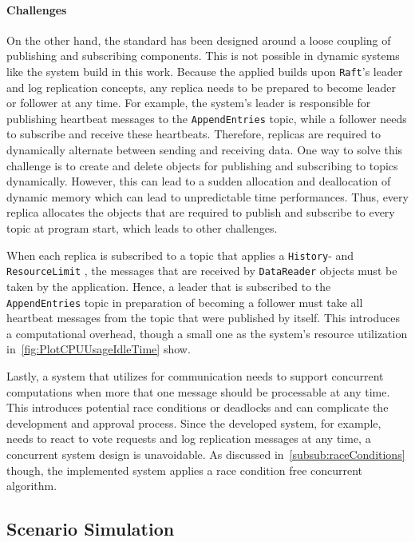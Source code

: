\paragraph{Challenges}
On the other hand, the  standard has been designed around a loose coupling of publishing and subscribing components.
This is not possible in dynamic systems like the system build in this work.
Because the applied  builds upon \texttt{Raft}'s leader and log replication concepts, any replica needs to be prepared to become leader or follower at any time.
For example, the system's leader is responsible for publishing heartbeat messages to the \texttt{AppendEntries} topic, while a follower needs to subscribe and receive these heartbeats.
Therefore, replicas are required to dynamically alternate between sending and receiving data.
One way to solve this challenge is to create and delete objects for publishing and subscribing to topics dynamically.
However, this can lead to a sudden allocation and deallocation of dynamic memory which can lead to unpredictable time performances.
Thus, every replica allocates the objects that are required to publish and subscribe to every topic at program start, which leads to other challenges.

When each replica is subscribed to a topic that applies a \texttt{History}- and \texttt{ResourceLimit} , the messages that are received by \texttt{DataReader} objects must be taken by the application.
Hence, a leader that is subscribed to the \texttt{AppendEntries} topic in preparation of becoming a follower must take all heartbeat messages from the topic that were published by itself.
This introduces a computational overhead, though a small one as the system's resource utilization in~\autoref{fig:PlotCPUUsageIdleTime} show.

Lastly, a system that utilizes  for communication needs to support concurrent computations when more that one message should be processable at any time.
This introduces potential race conditions or deadlocks and can complicate the development and approval process.
Since the developed system, for example, needs to react to vote requests and log replication messages at any time, a concurrent system design is unavoidable.
As discussed in~\autoref{subsub:raceConditions} though, the implemented system applies a race condition free concurrent algorithm.


\subsection{Scenario Simulation}
\label{subsec:ScenarioSimulation}

